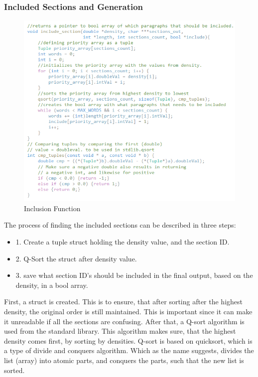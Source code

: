\subsubsection{Included Sections and Generation}
\begin{figure}[H]
  \centering
  \includegraphics[scale = 1]{figures/includefunction_v2.png}
  \caption{Inclusion Function}\label{fig:includefunction_v2}
\end{figure}
The process of finding the included sections can be described in three steps:
\begin{itemize}
  \item 1. Create a tuple struct holding the density value, and the section ID.
  \item 2. Q-Sort the struct after density value.
  \item 3. save what section ID's should be included in the final output, based on the density, in a bool array.
\end{itemize}
First, a struct is created. This is to ensure, that after sorting after the highest density, the original order is still maintained.
This is important since it can make it unreadable if all the sections are confusing. 
After that, a Q-sort algorithm is used from the standard library. This algorithm makes sure, that the highest density comes first, by sorting by densities.
Q-sort is based on quicksort, which is a type of divide and conquers algorithm. Which as the name suggests, divides the list (array) into atomic parts, and conquers the parts, such that the new list is sorted.
